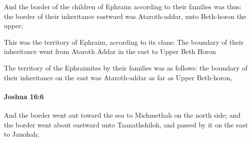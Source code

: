 			\begin{versebox}
					\item[BHS] 
					\item[ASV] And the border of the children of Ephraim according to their families was thus: the border of their inheritance eastward was Ataroth-addar, unto Beth-horon the upper;
					\item[NIV] This was the territory of Ephraim, according to its clans: The boundary of their inheritance went from Ataroth Addar in the east to Upper Beth Horon
					\item[NRSV] The territory of the Ephraimites by their families was as follows: the boundary of their inheritance on the east was Ataroth-addar as far as Upper Beth-horon,
			\end{versebox}

		\paragraph{Joshua 16:6} %
			\label{JOSHUA-16-6}

			And the border went out toward the sea to Michmethah on the north side; and the border went about eastward unto Taanathshiloh, and passed by it on the east to Janohah;

